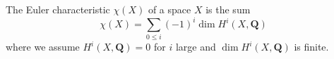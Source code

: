 The Euler characteristic $\chi(X)$ of a space $X$ is the sum
$$\chi(X) = \sum_{0 \leq i} (-1)^i \dim H^i(X, \mathbf{Q})$$
where we assume $H^i(X, \mathbf{Q}) = 0$ for $i$ large and $\dim H^i(X, \mathbf{Q})$ is finite.
